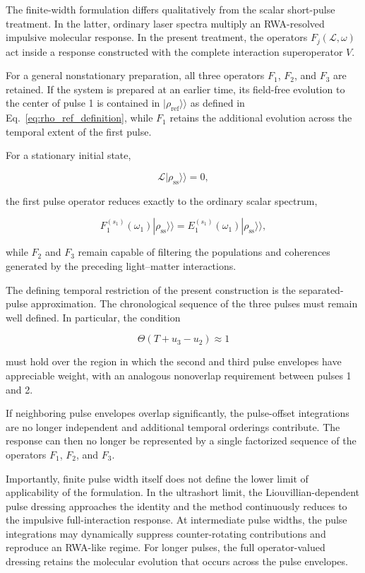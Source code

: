 \documentclass[11pt]{article}
\begin{document}
The finite-width formulation differs qualitatively from the scalar
short-pulse treatment. In the latter, ordinary laser spectra multiply
an RWA-resolved impulsive molecular response. In the present treatment,
the operators $F_j(\mathcal{L},\omega)$ act inside a response
constructed with the complete interaction superoperator $V$.

For a general nonstationary preparation, all three operators
$F_1$, $F_2$, and $F_3$ are retained. If the system is prepared at an
earlier time, its field-free evolution to the center of pulse 1 is
contained in $|\rho_{\mathrm{ref}}\rangle\rangle$ as defined in
Eq.~\eqref{eq:rho_ref_definition}, while $F_1$ retains the additional
evolution across the temporal extent of the first pulse.

For a stationary initial state,

\begin{equation}
\mathcal{L}
|\rho_{\mathrm{ss}}\rangle\rangle
=
0,
\end{equation}

the first pulse operator reduces exactly to the ordinary scalar
spectrum,

\begin{equation}
F_1^{(s_1)}(\omega_1)
|\rho_{\mathrm{ss}}\rangle\rangle
=
E_1^{(s_1)}(\omega_1)
|\rho_{\mathrm{ss}}\rangle\rangle,
\end{equation}

while $F_2$ and $F_3$ remain capable of filtering the populations and
coherences generated by the preceding light--matter interactions.

The defining temporal restriction of the present construction is the
separated-pulse approximation. The chronological sequence of the three
pulses must remain well defined. In particular, the condition

\begin{equation}
\Theta(T+u_3-u_2)
\approx1
\end{equation}

must hold over the region in which the second and third pulse
envelopes have appreciable weight, with an analogous nonoverlap
requirement between pulses 1 and 2.

If neighboring pulse envelopes overlap significantly, the pulse-offset
integrations are no longer independent and additional temporal
orderings contribute. The response can then no longer be represented
by a single factorized sequence of the operators
$F_1$, $F_2$, and $F_3$.

Importantly, finite pulse width itself does not define the lower limit
of applicability of the formulation. In the ultrashort limit, the
Liouvillian-dependent pulse dressing approaches the identity and the
method continuously reduces to the impulsive full-interaction
response. At intermediate pulse widths, the pulse integrations may
dynamically suppress counter-rotating contributions and reproduce an
RWA-like regime. For longer pulses, the full operator-valued dressing
retains the molecular evolution that occurs across the pulse
envelopes.
\end{document}
